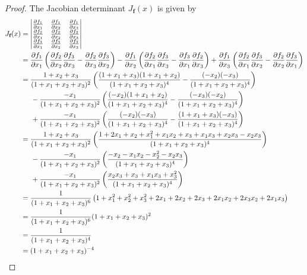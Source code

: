 \documentclass[12pt]{article}
\newcommand{\bvec}[1]{\textbf{#1}}
\begin{document}
\begin{proof}
    The Jacobian determinant $J_{\bvec{f}}(x)$ is given by
    \begin{align*}
    J_{\bvec{f}}(x)&=
    \begin{vmatrix}
    \frac{\partial f_1}{\partial x_1} & \frac{\partial f_1}{\partial x_2} & \frac{\partial f_1}{\partial x_3} \\
    \frac{\partial f_2}{\partial x_1} & \frac{\partial f_2}{\partial x_2} & \frac{\partial f_2}{\partial x_3} \\
    \frac{\partial f_3}{\partial x_1} & \frac{\partial f_3}{\partial x_2} & \frac{\partial f_3}{\partial x_3} \\
    \end{vmatrix}\\
    &=\frac{\partial f_1}{\partial x_1}\left(\frac{\partial f_2}{\partial x_2}\frac{\partial f_3}{\partial x_3}-\frac{\partial f_2}{\partial x_3}\frac{\partial f_3}{\partial x_2}\right)
    -\frac{\partial f_1}{\partial x_2}\left(
    \frac{\partial f_2}{\partial x_1}\frac{\partial f_3}{\partial x_3}-\frac{\partial f_3}{\partial x_1}
    \frac{\partial f_2}{\partial x_3}
    \right)+\frac{\partial f_1}{\partial x_3}\left(
    \frac{\partial f_2}{\partial x_1}\frac{\partial f_3}{\partial x_2}-
    \frac{\partial f_2}{\partial x_2}\frac{\partial f_3}{\partial x_1}
    \right)\\
    &=\frac{1+x_2+x_3}{(1+x_1+x_2+x_3)^2}\left(\frac{(1+x_1+x_3)(1+x_1+x_2)}{(1+x_1+x_2+x_3)^4}-\frac{(-x_2)(-x_3)}{(1+x_1+x_2+x_3)^4}\right)\\
    &\hspace{.5cm}-\frac{-x_1}{(1+x_1+x_2+x_3)^2}\left(
    \frac{(-x_2)(1+x_1+x_2)}{(1+x_1+x_2+x_3)^4}-\frac{(-x_3)(-x_2)}{(1+x_1+x_2+x_3)^4}
    \right)\\
    &\hspace{.5cm}+\frac{-x_1}{(1+x_1+x_2+x_3)^2}\left(
    \frac{(-x_2)(-x_3)}{(1+x_1+x_2+x_3)^4}-
    \frac{(1+x_1+x_3)(-x_3)}{(1+x_1+x_2+x_3)^4}
    \right)\\
    &=\frac{1+x_2+x_3}{(1+x_1+x_2+x_3)^2}\left(\frac{1+2x_1+x_2+x_1^2+x_1x_2+x_3+x_1x_3+x_2x_3-x_2x_3}{(1+x_1+x_2+x_3)^4}\right)\\
    &\hspace{.5cm}-\frac{-x_1}{(1+x_1+x_2+x_3)^2}\left(
    \frac{-x_2-x_1x_2-x_2^2-x_2x_3}{(1+x_1+x_2+x_3)^4}
    \right)\\
    &\hspace{.5cm}+\frac{-x_1}{(1+x_1+x_2+x_3)^2}\left(
    \frac{x_2x_3+x_3+x_1x_3+x_3^2}{(1+x_1+x_2+x_3)^4}\right)\\
    &=\frac{1}{(1+x_1+x_2+x_3)^6}\left(1+x_1^2+x_2^2+x_3^2+2x_1+2x_2+2x_3+2x_1x_2+2x_3x_2+2x_1x_3\right)\\
    &=\frac{1}{(1+x_1+x_2+x_3)^6}(1+x_1+x_2+x_3)^2\\
    &=\frac{1}{(1+x_1+x_2+x_3)^4}\\
    &=(1+x_1+x_2+x_3)^{-4}
\end{align*}


\end{proof}
\end{document}
